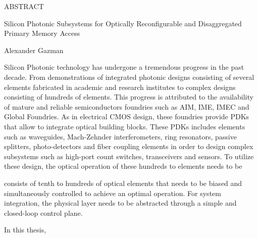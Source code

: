 
\pagestyle{empty} %
\begin{center}
  ABSTRACT

  Silicon Photonic Subsystems for Optically Reconfigurable and Disaggregated Primary Memory Access

  Alexander Gazman
\end{center}

Silicon Photonic technology has undergone a tremendous progress in the past decade. From demonstrations of integrated photonic designs consisting of several elements fabricated in academic and research institutes to complex designs consisting of hundreds of elements. This progress is attributed to the availability of mature and reliable semiconductors foundries such as AIM, IME, IMEC and Global Foundries. As in electrical CMOS design, these foundries provide PDKs that allow to integrate optical building blocks. These PDKs includes elements such as waveguides, Mach-Zehnder interferometers, ring resonators, passive splitters, photo-detectors and fiber coupling elements in order to design complex subsystems such as high-port count switches, transceivers and sensors. To utilize these design, the optical operation of these hundreds to elements needs to be 



consists of tenth to hundreds of optical elements that needs to be biased and simultaneously controlled to achieve an optimal operation. For system integration, the physical layer needs to be abstracted through a simple and closed-loop control plane. 

In this thesis, 